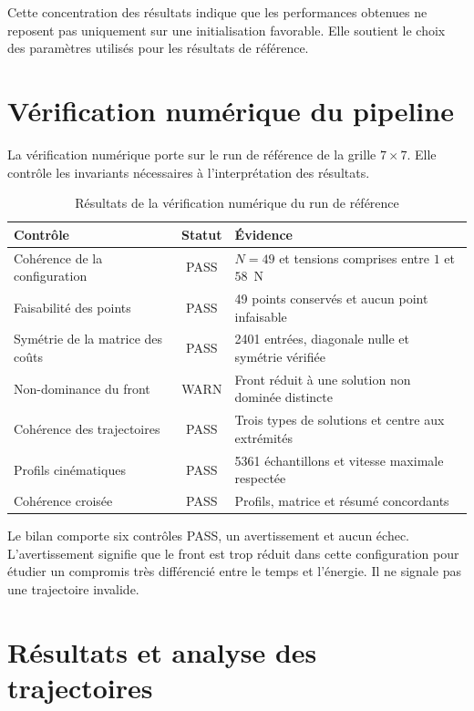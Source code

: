 Cette concentration des résultats indique que les performances obtenues ne reposent pas uniquement sur une initialisation favorable. Elle soutient le choix des paramètres utilisés pour les résultats de référence.

\section{Vérification numérique du pipeline}
\label{sec:verification_numerique_nouveau}

La vérification numérique porte sur le run de référence de la grille $7\times7$. Elle contrôle les invariants nécessaires à l'interprétation des résultats.

\begin{table}[H]
\centering
\caption{Résultats de la vérification numérique du run de référence}
\label{tab:validation_nouveau}
\footnotesize
\begin{tabular}{|p{5.0cm}|c|p{6.5cm}|}
\hline
\textbf{Contrôle} & \textbf{Statut} & \textbf{Évidence} \\
\hline
Cohérence de la configuration & PASS & $N=49$ et tensions comprises entre $1$ et $58$~N \\
\hline
Faisabilité des points & PASS & 49 points conservés et aucun point infaisable \\
\hline
Symétrie de la matrice des coûts & PASS & 2401 entrées, diagonale nulle et symétrie vérifiée \\
\hline
Non-dominance du front & WARN & Front réduit à une solution non dominée distincte \\
\hline
Cohérence des trajectoires & PASS & Trois types de solutions et centre aux extrémités \\
\hline
Profils cinématiques & PASS & 5361 échantillons et vitesse maximale respectée \\
\hline
Cohérence croisée & PASS & Profils, matrice et résumé concordants \\
\hline
\end{tabular}
\end{table}

Le bilan comporte six contrôles PASS, un avertissement et aucun échec. L'avertissement signifie que le front est trop réduit dans cette configuration pour étudier un compromis très différencié entre le temps et l'énergie. Il ne signale pas une trajectoire invalide.

\section{Résultats et analyse des trajectoires}
\label{sec:resultats_trajectoires}

